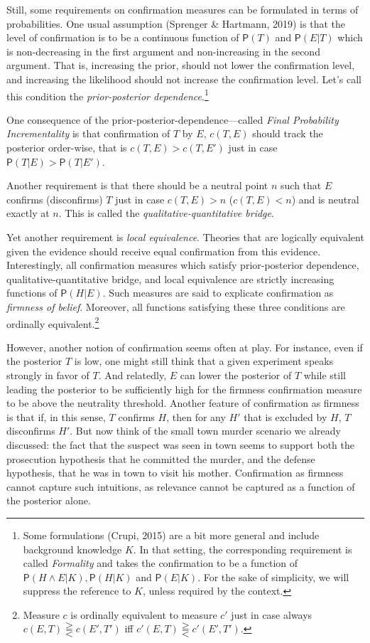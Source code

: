 \documentclass[
  10pt,
  dvipsnames,enabledeprecatedfontcommands]{scrartcl}
\newcommand{\et}{\wedge}
\newcommand{\pr}[1]{\mathsf{P}(#1)}
\begin{document}
Still, some requirements on confirmation measures can be formulated in
terms of probabilities. One usual assumption (Sprenger \& Hartmann,
2019) is that the level of confirmation is to be a continuous function
of \(\pr{T}\) and \(\pr{E\vert T}\) which is non-decreasing in the first
argument and non-increasing in the second argument. That is, increasing
the prior, should not lower the confirmation level, and increasing the
likelihood should not increase the confirmation level. Let's call this
condition the \emph{prior-posterior dependence}.\footnote{Some
  formulations (Crupi, 2015) are a bit more general and include
  background knowledge \(K\). In that setting, the corresponding
  requirement is called \emph{Formality} and takes the confirmation to
  be a function of \(\pr{H \et E \vert K}, \pr{H\vert K}\) and
  \(\pr{E\vert K}\). For the sake of simplicity, we will suppress the
  reference to \(K\), unless required by the context.}

One consequence of the prior-posterior-dependence---called
\emph{Final Probability Incrementality} is that confirmation of \(T\) by
\(E\), \(c(T,E)\) should track the posterior order-wise, that is
\(c(T,E)>c(T,E')\) just in case \(\pr{T\vert E} > \pr{T\vert E'}\).

Another requirement is that there should be a neutral point \(n\) such
that \(E\) confirms (disconfirms) \(T\) just in case \(c(T,E)>n\)
(\(c(T,E)<n\)) and is neutral exactly at \(n\). This is called the
\emph{qualitative-quantitative bridge}.

Yet another requirement is \emph{local equivalence}. Theories that are
logically equivalent given the evidence should receive equal
confirmation from this evidence. Interestingly, all confirmation
measures which satisfy prior-posterior dependence,
qualitative-quantitative bridge, and local equivalence are strictly
increasing functions of \(\pr{H \vert E}\). Such measures are said to
explicate confirmation as \emph{firmness of belief}. Moreover, all
functions satisfying these three conditions are ordinally
equivalent.\footnote{Measure $c$ is ordinally equivalent to measure $c'$ just in case always $c(E , T) \gtreqqless c(E', T')$ iff $c'(E , T) \gtreqqless c'(E' , T')$.}

However, another notion of confirmation seems often at play. For
instance, even if the posterior \(T\) is low, one might still think that
a given experiment speaks strongly in favor of \(T\). And relatedly,
\(E\) can lower the posterior of \(T\) while still leading the posterior
to be sufficiently high for the firmness confirmation measure to be
above the neutrality threshold. Another feature of confirmation as
firmness is that if, in this sense, \(T\) confirms \(H\), then for any
\(H'\) that is excluded by \(H\), \(T\) disconfirms \(H'\). But now
think of the small town murder scenario we already discussed: the fact
that the suspect was seen in town seems to support both the prosecution
hypothesis that he committed the murder, and the defense hypothesis,
that he was in town to visit his mother. Confirmation as firmness cannot
capture such intuitions, as relevance cannot be captured as a function
of the posterior alone.
\end{document}
